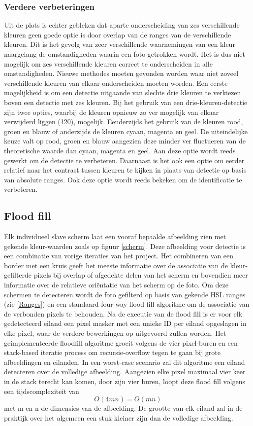 \subsubsection{Verdere verbeteringen} \label{Verbeteringen kleur}
Uit de plots is echter gebleken dat aparte onderscheiding van zes verschillende kleuren geen goede optie is door overlap van de ranges van de verschillende kleuren. Dit is het gevolg van zeer verschillende waarnemingen van een kleur naargelang de omstandigheden waarin een foto getrokken wordt. Het is dus niet mogelijk om zes verschillende kleuren correct te onderscheiden in alle omstandigheden. Nieuwe methodes moeten gevonden worden waar niet zoveel verschillende kleuren van elkaar onderscheiden moeten worden. Een eerste mogelijkheid is om een detectie uitgaande van slechts drie kleuren te verkiezen boven een detectie met zes kleuren. Bij het gebruik van een drie-kleuren-detectie zijn twee opties, waarbij de kleuren opnieuw zo ver mogelijk van elkaar verwijderd liggen (120\degree),  mogelijk. Eenderzijds het gebruik van de kleuren rood, groen en blauw of anderzijds de kleuren cyaan, magenta en geel. De uiteindelijke keuze valt op rood, groen en blauw aangezien deze minder ver fluctueren van de theoretische waarde dan cyaan, magenta en geel. Aan deze optie wordt reeds gewerkt om de detectie te verbeteren. Daarnaast is het ook een optie om eerder relatief naar het contrast tussen kleuren te kijken in plaats van detectie op basis van absolute ranges. Ook deze optie wordt reeds bekeken om de identificatie te verbeteren.

\subsection{Flood fill}
Elk individueel slave scherm laat een vooraf bepaalde afbeelding zien met gekende kleur-waarden zoals op figuur \ref{scherm}. Deze afbeelding voor detectie is een combinatie van vorige iteraties van het project. Het combineren van een border met een kruis geeft het meeste informatie over de associatie van de kleur-gefilterde pixels bij overlap of afgedekte delen van het scherm en bovendien meer informatie over de relatieve oriëntatie van het scherm op de foto. Om deze schermen te detecteren wordt de foto gefilterd op basis van gekende HSL ranges (zie \ref{Ranges}) en een standaard four-way flood fill algoritme \cite{floodfill} om de associatie van de verbonden pixels te behouden. Na de executie van de flood fill is er voor elk gedetecteerd eiland een pixel masker met een unieke ID per eiland opgeslagen in elke pixel, waar de verdere bewerkingen op uitgevoerd zullen worden. Het geimplementeerde floodfill algoritme groeit volgens de vier pixel-buren en een stack-based iteratie process om recursie-overflow tegen te gaan bij grote afbeeldingen en eilanden. In een worst-case scenario zal dit algoritme een eiland detecteren over de volledige afbeelding. Aangezien elke pixel maximaal vier keer in de stack terecht kan komen, door zijn vier buren, loopt deze flood fill volgens een tijdscomplexiteit van 
\[O(4mn)=O(mn)\]
 met m en n de dimensies van de afbeelding. De grootte van elk eiland zal in de praktijk over het algemeen een stuk kleiner zijn dan de volledige afbeelding. \\

